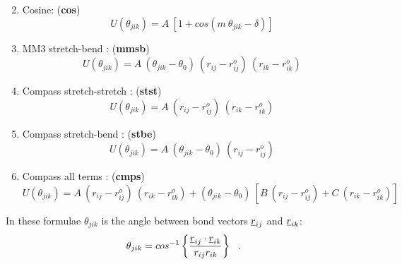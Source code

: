 \begin{enumerate}
\begin{equation}
\end{equation}
\item Cosine:  ({\bf cos})
\begin{equation}
U(\theta_{jik}) = A~[1 + cos(m~\theta_{jik}-\delta)]
\end{equation}
\item MM3 stretch-bend \cite{allinger-89a}:  ({\bf mmsb})
\begin{equation}
U(\theta_{jik}) = A~(\theta_{jik}-\theta_{0})~(r_{ij} - r_{ij}^{o})~(r_{ik} - r_{ik}^{o})
\end{equation}
\item Compass stretch-stretch \cite{sun-98}:  ({\bf stst})
\begin{equation}
U(\theta_{jik}) = A~(r_{ij} - r_{ij}^{o})~(r_{ik} - r_{ik}^{o})
\end{equation}
\item Compass stretch-bend \cite{sun-98}:  ({\bf stbe})
\begin{equation}
U(\theta_{jik}) = A~(\theta_{jik}-\theta_{0})~(r_{ij} - r_{ij}^{o})
\end{equation}
\item Compass all terms \cite{sun-98}:  ({\bf cmps})
\begin{equation}
U(\theta_{jik}) = A~(r_{ij} - r_{ij}^{o})~(r_{ik} - r_{ik}^{o}) +
(\theta_{jik}-\theta_{0})~[B~(r_{ij} - r_{ij}^{o})+C~(r_{ik} - r_{ik}^{o})]
\end{equation}
\end{enumerate}
In these formulae $\theta_{jik}$ is the angle between bond vectors
$\mbox{$\underline{r}$}_{ij}$ and $\mbox{$\underline{r}$}_{ik}$:
\begin{equation}
\theta_{jik}=cos^{-1}\left\{\frac{\mbox{$\underline{r}$}_{ij}\cdot\mbox{$\underline{r}$}_{ik}}
{r_{ij}r_{ik}}\right\}~~.
\end{equation}

